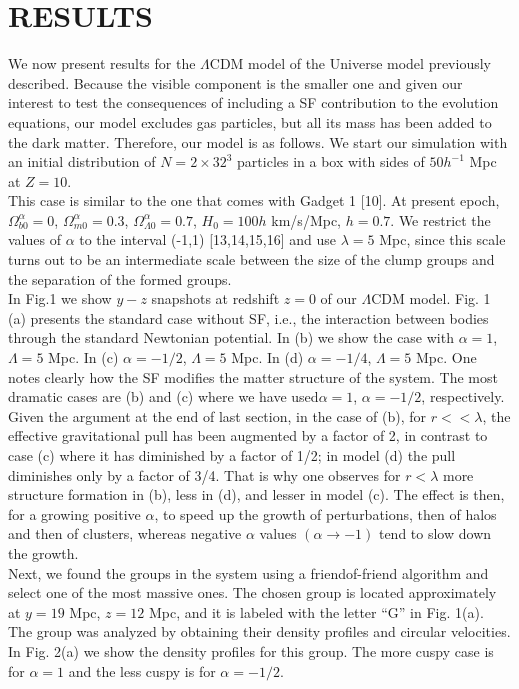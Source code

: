 \documentclass[10pt,times]{IEEEtran}
\begin{document}
\section{\textbf{RESULTS}}
We now present results for the \(\Lambda\)CDM model of the Universe model previously described. Because the visible component is the smaller one and given our interest to test the consequences of including a SF contribution to the evolution equations, our model excludes gas particles, but all its mass has been added to the dark matter. Therefore, our model is as follows. We start our simulation with an initial distribution of \(N=2\times32^{3}\) particles in a box with sides of $50h^{-1}$ Mpc at $Z=10$.\\
This case is similar to the one that comes with Gadget 1
[10]. At present epoch, \(\Omega_{b0}^{\alpha}=0\), \(\Omega_{m0}^{\alpha}=0.3\), \(\Omega_{\Lambda0}^{\alpha}=0.7\), $H_{0}=100h$ km/s/Mpc, $h=0.7$. We restrict the values of \(\alpha\) to the interval (-1,1) [13,14,15,16] and use \(\lambda=5\) Mpc, since this scale turns out to be an intermediate scale
between the size of the clump groups and the separation
of the formed groups.\\

In Fig.1 we show $y-z$ snapshots at redshift $z=0$ of our \(\Lambda\)CDM model. Fig. 1 (a) presents the standard case without SF, i.e., the interaction between bodies through the standard Newtonian potential. In (b) we show the case with \(\alpha=1\), \(\Lambda=5\) Mpc. In (c) \(\alpha=-1/2\), \(\Lambda=5\) Mpc. In (d) \(\alpha=-1/4\), \(\Lambda=5\) Mpc. One notes clearly how the SF modifies the matter structure of the system.
The most dramatic cases are (b) and (c) where we have used\(\alpha=1\), \(\alpha=-1/2\), respectively.  Given the argument at the end of last section, in the case of (b),
for \(r<<\lambda\), the effective gravitational pull has been augmented by a factor of 2, in contrast to case (c) where
it has diminished by a factor of 1/2; in model (d) the
pull diminishes only by a factor of 3/4. That is why one
observes for \(r<\lambda\) more structure formation in (b), less
in (d), and lesser in model (c). The effect is then, for a
growing positive \(\alpha\), to speed up the growth of perturbations, then of halos and then of clusters, whereas negative
\(\alpha\) values \((\alpha\rightarrow -1)\) tend to slow down the growth.\\

Next, we found the groups in the system using a friendof-friend algorithm and select one of the most massive ones. The chosen group is located approximately at $y =
19$ Mpc, $z = 12$ Mpc, and it is labeled with the letter “G”
in Fig. 1(a). The group was analyzed by obtaining their
density profiles and circular velocities. In Fig. 2(a) we
show the density profiles for this group. The more cuspy
case is for \(\alpha=1\) and the less cuspy is for \(\alpha=-1/2\).\\
\end{document}
